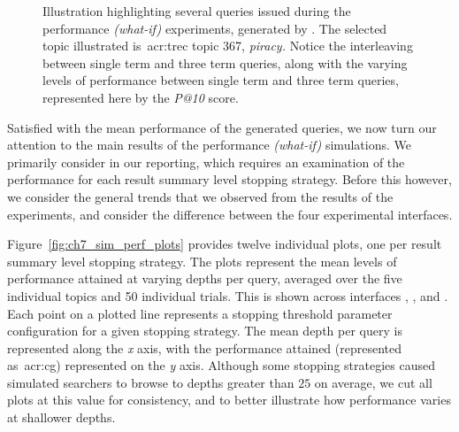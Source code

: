 \begin{figure}[t!]
    \centering
    \caption[Example queries issued]{Illustration highlighting several queries issued during the performance \emph{(what-if)} experiments, generated by . The selected topic illustrated is~\gls{acr:trec} topic 367, \emph{piracy.} Notice the interleaving between single term and three term queries, along with the varying levels of performance between single term and three term queries, represented here by the \emph{P@10} score.}
    \label{fig:ch7_example_queries}
\end{figure}

Satisfied with the mean performance of the generated queries, we now turn our attention to the main results of the performance \emph{(what-if)} simulations. We primarily consider  in our reporting, which requires an examination of the performance for each result summary level stopping strategy. Before this however, we consider the general trends that we observed from the results of the experiments, and consider the difference between the four experimental interfaces.

Figure~\ref{fig:ch7_sim_perf_plots} provides twelve individual plots, one per result summary level stopping strategy. The plots represent the mean levels of performance attained at varying depths per query, averaged over the five individual topics and 50 individual trials. This is shown across interfaces , ,  and . Each point on a plotted line represents a stopping threshold parameter configuration for a given stopping strategy. The mean depth per query is represented along the \emph{x} axis, with the performance attained (represented as~\gls{acr:cg}) represented on the \emph{y} axis. Although some stopping strategies caused simulated searchers to browse to depths greater than $25$ on average, we cut all plots at this value for consistency, and to better illustrate how performance varies at shallower depths.

